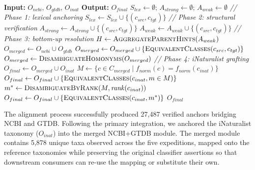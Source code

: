 \documentclass[11pt,a4paper]{article}
\begin{document}
\begin{algorithm}
\caption{Taxonomy alignment and integration workflow.}
\label{alg:tax_align}
\begin{algorithmic}[1]
\State \textbf{Input:} $O_{ncbi}$, $O_{gtdb}$, $O_{inat}$
\State \textbf{Output:} $O_{final}$
\State $S_{lex} \gets \emptyset$; $A_{strong} \gets \emptyset$; $A_{weak} \gets \emptyset$
\State \textit{// Phase 1: lexical anchoring}
        \State $S_{lex} \gets S_{lex} \cup \{(c_{src}, c_{tgt})\}$
    \EndIf
\EndFor
\State \textit{// Phase 2: structural verification}
        \State $A_{strong} \gets A_{strong} \cup \{(c_{src}, c_{tgt})\}$
    \Else
        \State $A_{weak} \gets A_{weak} \cup \{(c_{src}, c_{tgt})\}$
    \EndIf
\EndFor
\State \textit{// Phase 3: bottom-up resolution}
\State $H \gets \textsc{AggregateParentHints}(A_{weak})$
\State $O_{merged} \gets O_{ncbi} \cup O_{gtdb}$
    \State $O_{merged} \gets O_{merged} \cup
           \{\textsc{EquivalentClasses}(c_{src}, c_{tgt})\}$
\EndFor
\State $O_{merged} \gets \textsc{DisambiguateHomonyms}(O_{merged})$
\State \textit{// Phase 4: iNaturalist grafting}
\State $O_{final} \gets O_{merged} \cup O_{inat}$
    \State $M \gets \{c \in C_{merged} \mid f_{norm}(c) = f_{norm}(c_{inat})\}$
        \State $O_{final} \gets O_{final} \cup
               \{\textsc{EquivalentClasses}(c_{inat}, m \in M)\}$
        \State $m^* \gets \textsc{DisambiguateByRank}(M, \mathit{rank}(c_{inat}))$
        \State $O_{final} \gets O_{final} \cup
               \{\textsc{EquivalentClasses}(c_{inat}, m^*)\}$
    \EndIf
\EndFor
\State \Return $O_{final}$
\end{algorithmic}
\end{algorithm}

The alignment process successfully produced 27{,}487 verified anchors
bridging NCBI and GTDB. Following the primary integration, we anchored
the iNaturalist taxonomy ($O_{inat}$) into the merged
NCBI+GTDB module. The merged module contains 5{,}878 unique taxa
observed across the five expeditions, mapped onto the reference
taxonomies while preserving the original classifier assertions so that
downstream consumers can re-use the mapping or substitute their own.
\end{document}
